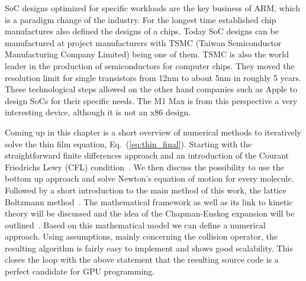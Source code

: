 SoC designs optimized for specific workloads are the key business of ARM, which is a paradigm change of the industry.
For the longest time established chip manufactures also defined the designs of a chips.
Today SoC designs can be manufactured at project manufacturers with TSMC (Taiwan Semiconductor Manufacturing Company Limited) being one of them.
TSMC is also the world leader in the production of semiconductors for computer chips. 
They moved the resolution limit for single transistors from 12nm to about 5nm in roughly 5 years.
These technological steps allowed on the other hand companies such as Apple to design SoCs for their specific needs. 
The M1 Max is from this perspective a very interesting device, although it is not an x86 design. 

Coming up in this chapter is a short overview of numerical methods to iteratively solve the thin film equation, Eq.~(\ref{eq:thin_final}).
Starting with the straightforward finite differences approach and an introduction of the Courant Friedrichs Lewy (CFL) condition~\cite{courantUeberPartiellenDifferenzengleichungen1928}.
We then discuss the possibility to use the bottom up approach and solve Newton's equation of motion for every molecule.
Followed by a short introduction to the main method of this work, the lattice Boltzmann method~\cite{frischLatticeGasAutomataNavierStokes1986, krugerLatticeBoltzmannMethod2017, succiLatticeBoltzmannEquation2001}. 
The mathematical framework as well as its link to kinetic theory will be discussed and the idea of the Chapman-Enskog expansion will be outlined~\cite{chapmanMathematicalTheoryNonuniform1990, enskogKinetischeTheorieVorgange1917}. 
Based on this mathematical model we can define a numerical approach.
Using assumptions, mainly concerning the collision operator, the resulting algorithm is fairly easy to implement and shows good scalability.
This closes the loop with the above statement that the resulting source code is a perfect candidate for GPU programming.

